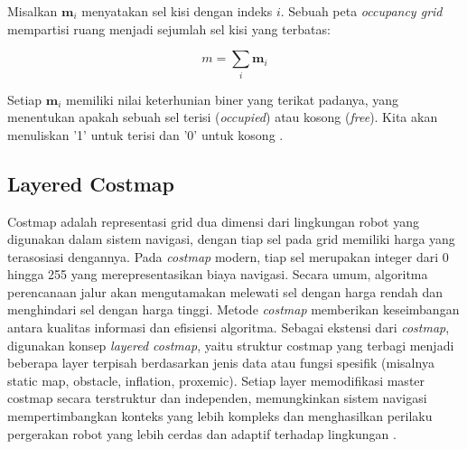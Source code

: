 Misalkan $\mathbf{m}_i$ menyatakan sel kisi dengan indeks $i$. Sebuah peta \textit{occupancy grid} mempartisi ruang menjadi sejumlah sel kisi yang terbatas:

\begin{equation}
m = \sum_i \mathbf{m}_i \tag{9.2}
\end{equation}

Setiap $\mathbf{m}_i$ memiliki nilai keterhunian biner yang terikat padanya, yang menentukan apakah sebuah sel terisi (\textit{occupied}) atau kosong (\textit{free}). Kita akan menuliskan '1' untuk terisi dan '0' untuk kosong \parencite{thrun2002probabilistic}. 

\subsection{Layered Costmap}
Costmap adalah representasi grid dua dimensi dari lingkungan robot yang digunakan dalam sistem navigasi, dengan tiap sel pada grid memiliki harga yang terasosiasi dengannya. Pada \emph{costmap} modern, tiap sel merupakan integer dari 0 hingga 255 yang merepresentasikan biaya navigasi. Secara umum, algoritma perencanaan jalur akan mengutamakan melewati sel dengan harga rendah dan menghindari sel dengan harga tinggi. Metode \emph{costmap} memberikan keseimbangan antara kualitas informasi dan efisiensi algoritma. Sebagai ekstensi dari \emph{costmap}, digunakan konsep \emph{layered costmap}, yaitu struktur costmap yang terbagi menjadi beberapa layer terpisah berdasarkan jenis data atau fungsi spesifik (misalnya static map, obstacle, inflation, proxemic). Setiap layer memodifikasi master costmap secara terstruktur dan independen, memungkinkan sistem navigasi mempertimbangkan konteks yang lebih kompleks dan menghasilkan perilaku pergerakan robot yang lebih cerdas dan adaptif terhadap lingkungan \parencite[]{macenski2023desks}.

